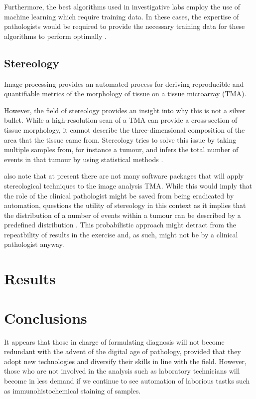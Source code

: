 \documentclass[12pt]{article}
\begin{document}
Furthermore, the best algorithms used in investigative labs employ the use of machine learning which require training 
data. In these cases, the expertise of pathologists would be required to provide the necessary training data for these 
algorithms to perform optimally \parencite{webster2014whole}.


\subsection{Stereology}
Image processing provides an automated process for deriving reproducible and quantifiable metrics of the 
morphology of tissue on a tissue microarray (TMA).

However, the field of stereology provides an insight into why this is not a silver bullet. While a high-resolution 
scan of a TMA can provide a cross-section of tissue morphology, it cannot describe the three-dimensional 
composition of the area that the tissue came from. Stereology tries to solve this issue by taking multiple samples 
from, for instance a tumour, and infers the total number of events in that tumour by using statistical methods 
\parencite{webster2014whole}.

\citeauthor{webster2014whole} also note that at present there are not many software packages that will apply 
stereological techniques to the image analysis TMA. While this would imply that the role of the clinical pathologist 
might be saved from being eradicated by automation, \citeauthor{suvarna2013bancroft} questions the utility of 
stereology in this context as it implies that the distribution of a number of events within a tumour can be described 
by a predefined distribution \parencite[p.~540, Ch.~23.]{suvarna2013bancroft}. This probabilistic approach might 
detract from the repeatbility of results in the exercise and, as such, might not be by a clinical pathologist anyway.

\section{Results}\label{results}

\section{Conclusions}\label{conclusions}

It appears that those in charge of formulating diagnosis will not become redundant with the advent of the digital age 
of pathology, provided that they adopt new technologies and diversify their skills in line with the field. However, those 
who are not involved in the analysis such as laboratory technicians will become in less demand if we continue to see 
automation of laborious tastks such as immunohistochemical staining of samples.
\end{document}
